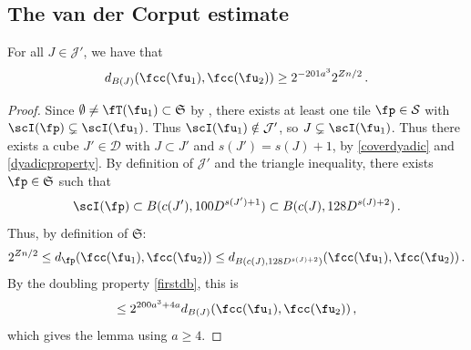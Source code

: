 \subsection{The van der Corput estimate}
\label{subsubsec-van-der-corput}
    \begin{lemma}
        \label{lower-oscillation-bound}
        \leanok
        For all $J \in \mathcal{J}'$, we have that
        $$
            d_{B(J)}(\fcc(\fu_1), \fcc(\fu_2)) \ge 2^{-201a^3} 2^{Zn/2}\,.
        $$
    \end{lemma}

    \begin{proof}
    Since $\emptyset \ne \fT(\fu_1) \subset \mathfrak{S}$ by , there exists at least one tile $\fp \in \mathcal{S}$ with $\scI(\fp) \subsetneq \scI(\fu_1)$. Thus $\scI(\fu_1) \notin \mathcal{J}'$, so $J \subsetneq \scI(\fu_1)$. Thus there exists a cube $J' \in \mathcal{D}$ with $J \subset J'$ and $s(J') = s(J) + 1$, by \eqref{coverdyadic} and \eqref{dyadicproperty}. By definition of $\mathcal{J'}$ and the triangle inequality, there exists $\fp \in \mathfrak{S}$ such that
    $$
        \scI(\fp) \subset B(c(J'), 100 D^{s(J') + 1}) \subset B(c(J), 128 D^{s(J)+2})\,.
    $$
    Thus, by definition of $\mathfrak{S}$:
    \begin{align*}
        2^{Zn/2} \le d_{\fp}(\fcc(\fu_1), \fcc(\fu_2)) \le d_{B(c(J), 128 D^{s(J)+2})}(\fcc(\fu_1), \fcc(\fu_2))\,.
    \end{align*}
    By the doubling property \eqref{firstdb}, this is
    $$
        \le 2^{200a^3 + 4a} d_{B(J)}(\fcc(\fu_1), \fcc(\fu_2))\,,
    $$
    which gives the lemma using $a \ge 4$.
    \end{proof}

